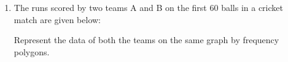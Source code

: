 \renewcommand{\theequation}{\theenumi}
\begin{enumerate}[label=\thesection.\arabic*.,ref=\thesection.\theenumi]
\item The runs scored by two teams A and B on
the first 60 balls in a cricket match are given
below:
\begin{table}[!ht]
\centering

\label{table:Q43}	
\end{table}
Represent the data of both the teams on the
same graph by frequency polygons.
\end{enumerate}